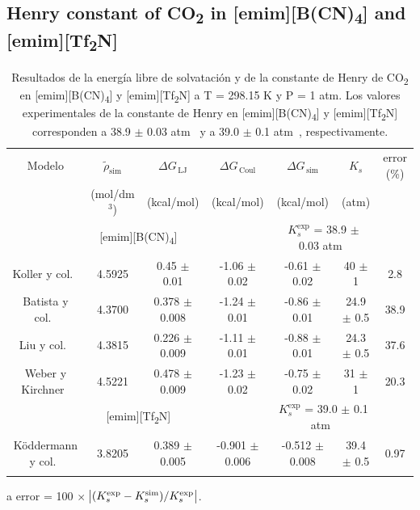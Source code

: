 \documentclass[3p,twocolumn]{elsarticle}
\begin{document}
\subsection{Henry constant of CO\textsubscript{2} in [emim][B(CN)\textsubscript{4}] and [emim][Tf\textsubscript{2}N]}
\label{sec:henry_results}

\begin{table}[htp]
\centering
\begin{adjustbox}{width=1\textwidth}
\begin{threeparttable}
\caption{Resultados de la energía libre de solvatación y de la constante de Henry de CO\textsubscript{2} en [emim][B(CN)\textsubscript{4}] y [emim][Tf\textsubscript{2}N] a T = 298.15 K y P = 1 atm. Los valores experimentales de la constante de Henry en [emim][B(CN)\textsubscript{4}] y [emim][Tf\textsubscript{2}N] corresponden a 38.9 $\pm$ 0.03 atm~\cite{Mahurin_2010} y a 39.0 $\pm$ 0.1 atm~\cite{Finotello_2008}, respectivamente.}
\begin{tabular}{ c c c  c  c  c  c }  
\toprule
Modelo & $\tilde{\rho}_{\text{sim}}$ & $\Delta G_{\,\text{LJ}}$  & $\Delta G_{\,\text{Coul}}$  & $\Delta G_{\,\text{sim}}$ & $K_{s}$ & error (\%)\tnote{a}\\
& (mol/dm$^{3}$) & (kcal/mol) & (kcal/mol) &  (kcal/mol) & (atm)  &  \\
			\hline
			\multicolumn{4}{c}{[emim][B(CN)\textsubscript{4}]} & \multicolumn{2}{c}{\cellcolor{gray!25}$K_{s}^{\text{exp}}$ = 38.9 $\pm$ 0.03 atm~\cite{Mahurin_2010}}\\
			\hline
Koller y col.~\cite{Koller_2012} & 4.5925 & 0.45 $\pm$ 0.01 & -1.06 $\pm$ 0.02 & -0.61 $\pm$ 0.02 & 40 $\pm$ 1 & 2.8 \\
Batista y col.~\cite{Batista_2015} & 4.3700 & 0.378 $\pm$ 0.008 & -1.24 $\pm$ 0.01  & -0.86 $\pm$ 0.01 & 24.9 $\pm$ 0.5 & 38.9 \\
Liu y col.~\cite{Liu_2014} & 4.3815 & 0.226 $\pm$ 0.009 & -1.11 $\pm$ 0.01 & -0.88 $\pm$ 0.01 & 24.3 $\pm$ 0.5 & 37.6  \\
Weber y Kirchner~\cite{Weber_2016} & 4.5221 & 0.478 $\pm$ 0.009 & -1.23 $\pm$ 0.02 & -0.75 $\pm$ 0.02 & 31 $\pm$ 1 & 20.3  \\
\hline
		\multicolumn{4}{c}{[emim][Tf\textsubscript{2}N]} & \multicolumn{2}{c}{ \cellcolor{gray!25} $K_{s}^{\text{exp}}$ = 39.0 $\pm$ 0.1 atm~\cite{Finotello_2008}}\\
		\hline
 K\"{o}ddermann y col.~\cite{K_ddermann_2007} &3.8205 & 0.389 $\pm$ 0.005 & -0.901 $\pm$ 0.006& -0.512 $\pm$ 0.008 & 39.4 $\pm$ 0.5  & 0.97  \\
 \bottomrule
\label{table:henry} 
\end{tabular}
\begin{tablenotes}
\item[a] error = 100 $\times$ $\abs{(K_s^{\text{exp}} - K_s^{\text{sim}})/K_s^{\text{exp}}}$.
\end{tablenotes}
\end{threeparttable}
\end{adjustbox}
\end{table}
\end{document}
